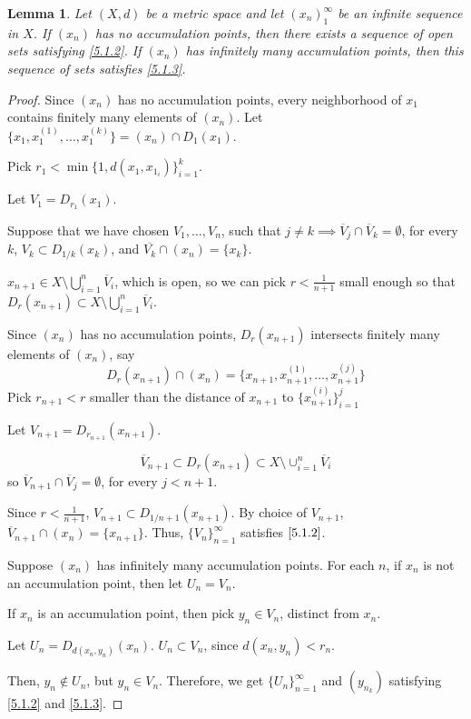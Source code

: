 \documentclass[openany, amssymb, psamsfonts]{amsart}
\newtheorem{lem}{Lemma}[section]
\theoremstyle{definition}
\numberwithin{equation}{section}
\begin{document}
\begin{lem}\label{lem:5.2}
  Let $(X,d)$ be a metric space and let $(x_n)_1^\infty$ be an infinite sequence in $X$. If $(x_n)$ has no accumulation points, then there exists a sequence of open sets satisfying \ref{5.1.2}. If $(x_n)$ has infinitely many accumulation points, then this sequence of sets satisfies \ref{5.1.3}.
\end{lem}
\begin{proof}
  Since $(x_n)$ has no accumulation points, every neighborhood of $x_1$ contains finitely many elements of $(x_n)$. Let $\{x_1, x_{1}^{(1)}, \ldots, x_{1}^{(k)}\} = (x_n) \cap D_1(x_1)$. 

  Pick $r_1 < \min\{1, d(x_1, x_{1_i})\}_{i=1}^k$. 

  Let $V_1 = D_{r_1}(x_1)$. 

  Suppose that we have chosen $V_1, \ldots, V_n$, such that $j\neq k \implies \overline{V}_j \cap \overline{V}_k = \emptyset$, for every $k$, $V_k \subset D_{1/k}(x_k)$, and $\overline{V_k} \cap (x_n) = \{x_k\}$. 

  $x_{n+1} \in X \setminus \bigcup_{i = 1}^n \overline{V}_i$, which is open, so we can pick $r<\frac1{n+1}$ small enough so that $D_r(x_{n+1})\subset X \setminus \bigcup_{i = 1}^n \overline{V}_i$. 

  Since $(x_n)$ has no accumulation points, $D_{r}(x_{n+1})$ intersects finitely many elements of $(x_n)$, say 
  $$D_r(x_{n+1})\cap(x_n) = \{x_{n+1}, x_{n+1}^{(1)}, \ldots, x_{n+1}^{(j)}\}$$ Pick $r_{n+1}< r$ smaller than the distance of $x_{n+1}$ to $\{x_{n+1}^{(i)}\}_{i=1}^j$

  Let $V_{n+1} = D_{r_{n+1}}(x_{n+1})$.  

  $$\overline{V}_{n+1} \subset D_r(x_{n+1}) \subset X\setminus \cup_{i=1}^n \overline{V}_i$$ so $\overline{V}_{n+1} \cap \overline{V}_{j} = \emptyset$, for every $j < n+1$. 

  Since $r < \frac{1}{n+1}$, $V_{n+1} \subset D_{1/n+1}(x_{n+1})$. By choice of $V_{n+1}$, $\overline{V}_{n+1} \cap (x_n) = \{x_{n+1}\}$. Thus, $\{V_n\}_{n=1}^\infty$ satisfies $\ref{5.1.2}$. 

  Suppose $(x_n)$ has infinitely many accumulation points. For each $n$, if $x_{n}$ is not an accumulation point, then let $U_n = V_n$. 

  If $x_n$ is an accumulation point, then pick $y_n \in V_n$, distinct from $x_n$. 

  Let $U_n = D_{d(x_n, y_n)}(x_n)$. $U_n \subset V_n$, since $d(x_n, y_n) < r_n$. 

  Then, $y_n \not \in U_n$, but $y_n \in V_n$. Therefore, we get $\{U_n\}_{n=1}^\infty$ and $(y_{n_k})$ satisfying \ref{5.1.2} and \ref{5.1.3}.  
\end{proof}
\end{document}
